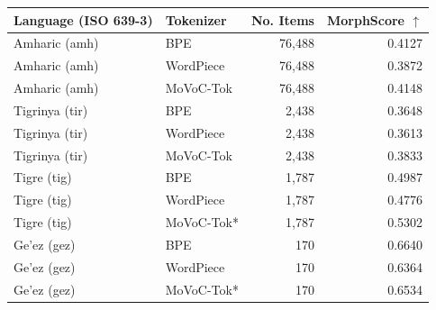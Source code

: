 \begin{tabular}{llrr}
\toprule
Language (ISO 639-3) & Tokenizer & No. Items & MorphScore $\uparrow$ \\
\midrule
Amharic (amh) & BPE & 76,488 & 0.4127 \\
Amharic (amh) & WordPiece & 76,488 & 0.3872 \\
Amharic (amh) & MoVoC-Tok & 76,488 & 0.4148 \\
Tigrinya (tir) & BPE & 2,438 & 0.3648 \\
Tigrinya (tir) & WordPiece & 2,438 & 0.3613 \\
Tigrinya (tir) & MoVoC-Tok & 2,438 & 0.3833 \\
Tigre (tig) & BPE & 1,787 & 0.4987 \\
Tigre (tig) & WordPiece & 1,787 & 0.4776 \\
Tigre (tig) & MoVoC-Tok* & 1,787 & 0.5302 \\
Ge'ez (gez) & BPE & 170 & 0.6640 \\
Ge'ez (gez) & WordPiece & 170 & 0.6364 \\
Ge'ez (gez) & MoVoC-Tok* & 170 & 0.6534 \\
\bottomrule
\end{tabular}
